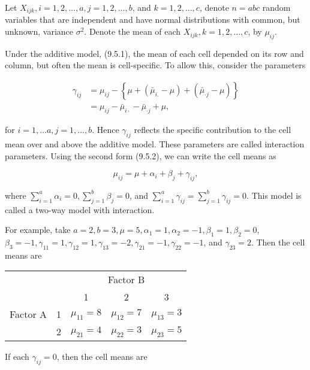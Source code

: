 Let $X_{i j k}, i=1,2, \ldots, a, j=1,2, \ldots, b$, and $k=1,2, \ldots, c$, denote $n=a b c$ random variables that are independent and have normal distributions with common, but unknown, variance $\sigma^{2}$. Denote the mean of each $X_{i j k}, k=1,2, \ldots, c$, by $\mu_{i j}$.

Under the additive model, (9.5.1), the mean of each cell depended on its row and column, but often the mean is cell-specific. To allow this, consider the parameters

$$
\begin{aligned}
\gamma_{i j} & =\mu_{i j}-\left\{\mu+\left(\bar{\mu}_{i .}-\mu\right)+\left(\bar{\mu}_{\cdot j}-\mu\right)\right\} \\
& =\mu_{i j}-\bar{\mu}_{i \cdot}-\bar{\mu}_{\cdot j}+\mu,
\end{aligned}
$$

for $i=1, \ldots a, j=1, \ldots, b$. Hence $\gamma_{i j}$ reflects the specific contribution to the cell mean over and above the additive model. These parameters are called interaction parameters. Using the second form (9.5.2), we can write the cell means as


\begin{equation*}
\mu_{i j}=\mu+\alpha_{i}+\beta_{j}+\gamma_{i j}, \tag{9.5.15}
\end{equation*}


where $\sum_{i=1}^{a} \alpha_{i}=0, \sum_{j=1}^{b} \beta_{j}=0$, and $\sum_{i=1}^{a} \gamma_{i j}=\sum_{j=1}^{b} \gamma_{i j}=0$. This model is called a two-way model with interaction.

For example, take $a=2, b=3, \mu=5, \alpha_{1}=1, \alpha_{2}=-1, \beta_{1}=1, \beta_{2}=0$, $\beta_{3}=-1, \gamma_{11}=1, \gamma_{12}=1, \gamma_{13}=-2, \gamma_{21}=-1, \gamma_{22}=-1$, and $\gamma_{23}=2$. Then the cell means are

\begin{center}
\begin{tabular}{|cc|ccc|}
\hline
 &  & \multicolumn{3}{|c|}{Factor B} \\
 &  & 1 & 2 & 3 \\
\hline
Factor A & 1 & $\mu_{11}=8$ & $\mu_{12}=7$ & $\mu_{13}=3$ \\
 & 2 & $\mu_{21}=4$ & $\mu_{22}=3$ & $\mu_{23}=5$ \\
\hline
\end{tabular}
\end{center}

If each $\gamma_{i j}=0$, then the cell means are

